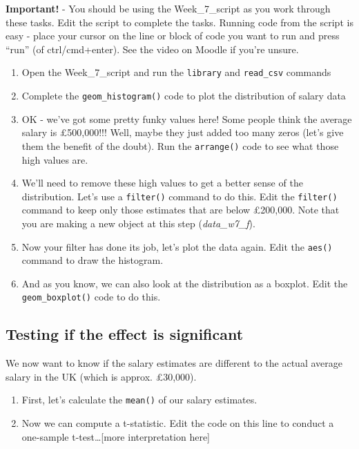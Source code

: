 \documentclass[
]{book}
\begin{document}
\textbf{Important!} - You should be using the Week\_7\_script as you work through these tasks. Edit the script to complete the tasks. Running code from the script is easy - place your cursor on the line or block of code you want to run and press ``run'' (of ctrl/cmd+enter). See the video on Moodle if you're unsure.

\begin{enumerate}
\def\labelenumi{\arabic{enumi}.}
\item
  Open the Week\_7\_script and run the \texttt{library} and \texttt{read\_csv} commands
\item
  Complete the \texttt{geom\_histogram()} code to plot the distribution of salary data
\item
  OK - we've got some pretty funky values here! Some people think the average salary is £500,000!!! Well, maybe they just added too many zeros (let's give them the benefit of the doubt). Run the \texttt{arrange()} code to see what those high values are.
\item
  We'll need to remove these high values to get a better sense of the distribution. Let's use a \texttt{filter()} command to do this. Edit the \texttt{filter()} command to keep only those estimates that are below £200,000. Note that you are making a new object at this step (\emph{data\_w7\_f}).
\item
  Now your filter has done its job, let's plot the data again. Edit the \texttt{aes()} command to draw the histogram.
\item
  And as you know, we can also look at the distribution as a boxplot. Edit the \texttt{geom\_boxplot()} code to do this.
\end{enumerate}

\hypertarget{testing-if-the-effect-is-significant}{%
\subsection{Testing if the effect is significant}\label{testing-if-the-effect-is-significant}}

We now want to know if the salary estimates are different to the actual average salary in the UK (which is approx. £30,000).

\begin{enumerate}
\def\labelenumi{\arabic{enumi}.}
\setcounter{enumi}{6}
\item
  First, let's calculate the \texttt{mean()} of our salary estimates.
\item
  Now we can compute a t-statistic. Edit the code on this line to conduct a one-sample t-test\ldots{[}more interpretation here{]}
\end{enumerate}
\end{document}
